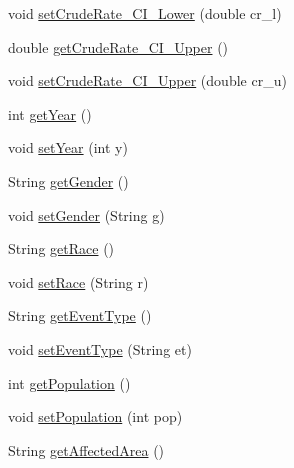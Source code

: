 \begin{DoxyCompactItemize}
\item 
void \mbox{\hyperlink{classbridges_1_1data__src__dependent_1_1_cancer_incidence_a72e3960af58f32d26e32f49ada2f1555}{set\+Crude\+Rate\+\_\+\+C\+I\+\_\+\+Lower}} (double cr\+\_\+l)
\item 
double \mbox{\hyperlink{classbridges_1_1data__src__dependent_1_1_cancer_incidence_a4ca1ceed275ab6371f861d3a03975f15}{get\+Crude\+Rate\+\_\+\+C\+I\+\_\+\+Upper}} ()
\item 
void \mbox{\hyperlink{classbridges_1_1data__src__dependent_1_1_cancer_incidence_a99e25dd53093badf350b06b7e0c8b725}{set\+Crude\+Rate\+\_\+\+C\+I\+\_\+\+Upper}} (double cr\+\_\+u)
\item 
int \mbox{\hyperlink{classbridges_1_1data__src__dependent_1_1_cancer_incidence_aaff714019154afa796d54ed57ffc9492}{get\+Year}} ()
\item 
void \mbox{\hyperlink{classbridges_1_1data__src__dependent_1_1_cancer_incidence_aa5524736b76d67f1248d1a05d9f596a9}{set\+Year}} (int y)
\item 
String \mbox{\hyperlink{classbridges_1_1data__src__dependent_1_1_cancer_incidence_a2c3cbe65d89827c167f15314b8b088b3}{get\+Gender}} ()
\item 
void \mbox{\hyperlink{classbridges_1_1data__src__dependent_1_1_cancer_incidence_a217681578e13197e1d177932c73ea80f}{set\+Gender}} (String g)
\item 
String \mbox{\hyperlink{classbridges_1_1data__src__dependent_1_1_cancer_incidence_a18de1c14d36cd7656555c8465ea8a009}{get\+Race}} ()
\item 
void \mbox{\hyperlink{classbridges_1_1data__src__dependent_1_1_cancer_incidence_a8c26c4358561453f3d2ca3a463eed872}{set\+Race}} (String r)
\item 
String \mbox{\hyperlink{classbridges_1_1data__src__dependent_1_1_cancer_incidence_a844c6c3317bdb6b124f32b40804e1ff7}{get\+Event\+Type}} ()
\item 
void \mbox{\hyperlink{classbridges_1_1data__src__dependent_1_1_cancer_incidence_a39338b20223e60b79fa38b3034ca46b7}{set\+Event\+Type}} (String et)
\item 
int \mbox{\hyperlink{classbridges_1_1data__src__dependent_1_1_cancer_incidence_a41c2507d46589080f6bb76ab29f53665}{get\+Population}} ()
\item 
void \mbox{\hyperlink{classbridges_1_1data__src__dependent_1_1_cancer_incidence_a9f1caf002b6573aa699a81ed1b835af0}{set\+Population}} (int pop)
\item 
String \mbox{\hyperlink{classbridges_1_1data__src__dependent_1_1_cancer_incidence_ad4c0c709fa5da9c0f20b648052db5f26}{get\+Affected\+Area}} ()

\end{DoxyCompactItemize}

